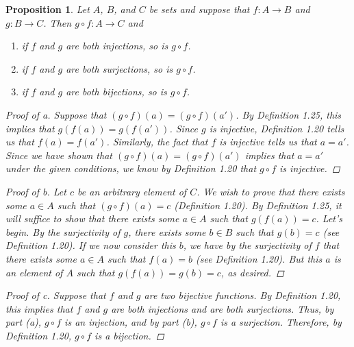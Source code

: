 \documentclass[titlepage]{article}
\newcounter{script}
\newtheorem{proposition}{Proposition}[script]
\theoremstyle{definition}
\begin{document}
\begin{proposition}
    Let $A$, $B$, and $C$ be sets and suppose that $f:A\to B$ and $g:B\to C$. Then $g\circ f:A\to C$ and
    \begin{enumerate}[label={\alph*\textup{)}}]
        \item if $f$ and $g$ are both injections, so is $g\circ f$.
        \item if $f$ and $g$ are both surjections, so is $g\circ f$.
        \item if $f$ and $g$ are both bijections, so is $g\circ f$.
    \end{enumerate}
    \begin{proof}[Proof of a]
        Suppose that $(g\circ f)(a)=(g\circ f)(a')$. By Definition 1.25, this implies that $g(f(a))=g(f(a'))$. Since $g$ is injective, Definition 1.20 tells us that $f(a)=f(a')$. Similarly, the fact that $f$ is injective tells us that $a=a'$. Since we have shown that $(g\circ f)(a)=(g\circ f)(a')$ implies that $a=a'$ under the given conditions, we know by Definition 1.20 that $g\circ f$ is injective.
    \end{proof}
    \begin{proof}[Proof of b]
        Let $c$ be an arbitrary element of $C$. We wish to prove that there exists some $a\in A$ such that $(g\circ f)(a)=c$ (Definition 1.20). By Definition 1.25, it will suffice to show that there exists some $a\in A$ such that $g(f(a))=c$. Let's begin. By the surjectivity of $g$, there exists some $b\in B$ such that $g(b)=c$ (see Definition 1.20). If we now consider this $b$, we have by the surjectivity of $f$ that there exists some $a\in A$ such that $f(a)=b$ (see Definition 1.20). But this $a$ is an element of $A$ such that $g(f(a))=g(b)=c$, as desired.
    \end{proof}
    \begin{proof}[Proof of c]
        Suppose that $f$ and $g$ are two bijective functions. By Definition 1.20, this implies that $f$ and $g$ are both injections and are both surjections. Thus, by part (a), $g\circ f$ is an injection, and by part (b), $g\circ f$ is a surjection. Therefore, by Definition 1.20, $g\circ f$ is a bijection.
    \end{proof}
\end{proposition}
\end{document}
